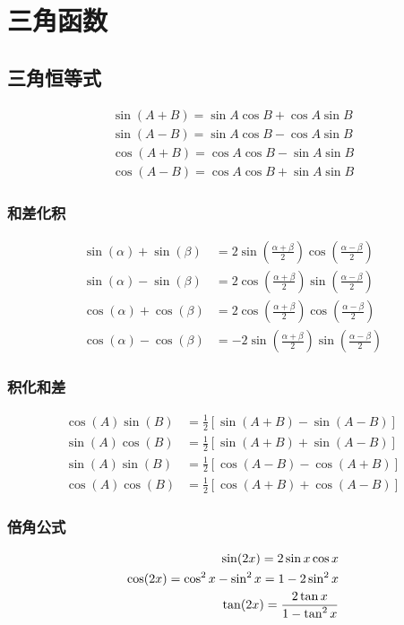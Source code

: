 \section{三角函数}\label{zhang_trigonometric_function}
\subsection{三角恒等式}
\begin{align}
    \sin(A+B)= \sin A\cos B+\cos A\sin B\\
    \sin(A-B)= \sin A\cos B-\cos A\sin B\\
    \cos(A+B)= \cos A\cos B-\sin A\sin B\\
    \cos(A-B)= \cos A\cos B+\sin A\sin B
\end{align}
\subsubsection{和差化积}
\begin{align}
    \sin(\alpha)+\sin(\beta)&=2\sin\left(\frac{\alpha+\beta}{2}\right)\cos\left(\frac{\alpha-\beta}{2}\right)\\
    \sin(\alpha)-\sin(\beta)&=2\cos \left(\frac{\alpha+\beta}{2}\right)\sin\left(\frac{\alpha-\beta}{2}\right)\\
    \cos(\alpha)+\cos(\beta)&=2\cos \left(\frac{\alpha+\beta}{2}\right)\cos\left(\frac{\alpha-\beta}{2}\right)\\
    \cos(\alpha)-\cos(\beta)&=-2\sin \left(\frac{\alpha+\beta}{2}\right)\sin\left(\frac{\alpha-\beta}{2}\right)
\end{align}
\subsubsection{积化和差}
\begin{align}
    \cos(A)\sin(B)&=\frac{1}{2}\left[\sin(A+B)-\sin(A-B)\right]\\
    \sin(A)\cos(B)&=\frac{1}{2}\left[\sin(A+B)+\sin(A-B)\right]\\
    \sin(A)\sin(B)&=\frac{1}{2}\left[\cos(A-B)-\cos(A+B)\right]\\
    \cos(A)\cos(B)&=\frac{1}{2}\left[\cos(A+B)+\cos(A-B)\right]
\end{align}
\subsubsection{倍角公式}
\begin{displaymath}
    \centering
    \begin{split}
        \sin(2x)=2\sin x\cos x\\
        \cos(2x)=\cos^2x-\sin^2x=1-2\sin^2 x\\
        \tan(2x)=\frac{2\tan x}{1-\tan^2x}
    \end{split}
\end{displaymath}
